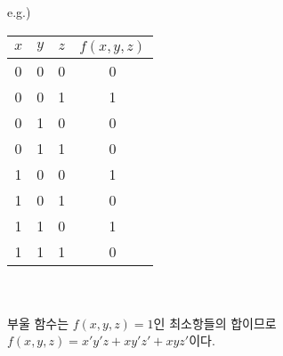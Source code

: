 e.g.)
\begin{center}
    \begin{tabular}[1]{c|c|c|c}
        $x$ & $y$ & $z$ & $f(x, y, z)$ \\
        \hline
        0   & 0   & 0   & 0            \\
        0   & 0   & 1   & 1            \\
        0   & 1   & 0   & 0            \\
        0   & 1   & 1   & 0            \\
        1   & 0   & 0   & 1            \\
        1   & 0   & 1   & 0            \\
        1   & 1   & 0   & 1            \\
        1   & 1   & 1   & 0
    \end{tabular}
\end{center}\phantom{}\\\\
부울 함수는 $f(x, y, z)=1$인 최소항들의 합이므로 $f(x, y, z) = x' y' z + xy' z' + xyz'$이다.

